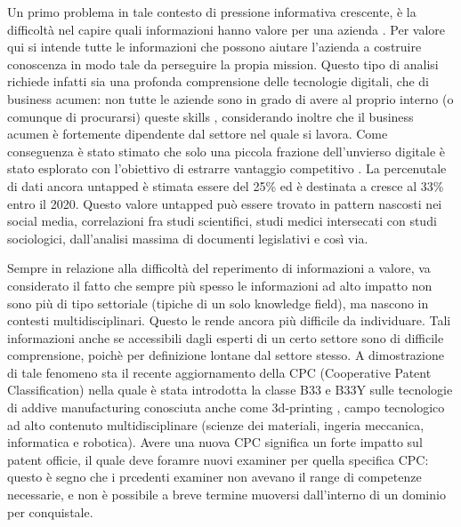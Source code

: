 \documentclass[]{book}
\begin{document}
Un primo problema in tale contesto di pressione informativa crescente, è
la difficoltà nel capire quali informazioni hanno valore per una azienda
\citep{larose2014discovering, chemchem2015data, kasemsap2015role} . Per
valore qui si intende tutte le informazioni che possono aiutare
l'azienda a costruire conoscenza in modo tale da perseguire la propia
mission. Questo tipo di analisi richiede infatti sia una profonda
comprensione delle tecnologie digitali, che di business acumen: non
tutte le aziende sono in grado di avere al proprio interno (o comunque
di procurarsi) queste skills
\citep{hecklau2016holistic, davenport2012data, provost2013data, van2014data},
considerando inoltre che il business acumen è fortemente dipendente dal
settore nel quale si lavora. Come conseguenza è stato stimato che solo
una piccola frazione dell'unvierso digitale è stato esplorato con
l'obiettivo di estrarre vantaggio competitivo \citep{data2012bigger}. La
percenutale di dati ancora untapped è stimata essere del 25\% ed è
destinata a cresce al 33\% entro il 2020. Questo valore untapped può
essere trovato in pattern nascosti nei social media, correlazioni fra
studi scientifici, studi medici intersecati con studi sociologici,
dall'analisi massima di documenti legislativi e così via.

Sempre in relazione alla difficoltà del reperimento di informazioni a
valore, va considerato il fatto che sempre più spesso le informazioni ad
alto impatto non sono più di tipo settoriale (tipiche di un solo
knowledge field), ma nascono in contesti multidisciplinari. Questo le
rende ancora più difficile da individuare. Tali informazioni anche se
accessibili dagli esperti di un certo settore sono di difficile
comprensione, poichè per definizione lontane dal settore stesso. A
dimostrazione di tale fenomeno sta il recente aggiornamento della CPC
(Cooperative Patent Classification) nella quale è stata introdotta la
classe B33 e B33Y sulle tecnologie di addive manufacturing conosciuta
anche come 3d-printing \citep{cpc2014}, campo tecnologico ad alto
contenuto multidisciplinare (scienze dei materiali, ingeria meccanica,
informatica e robotica). Avere una nuova CPC significa un forte impatto
sul patent officie, il quale deve foramre nuovi examiner per quella
specifica CPC: questo è segno che i prcedenti examiner non avevano il
range di competenze necessarie, e non è possibile a breve termine
muoversi dall'interno di un dominio per conquistale.
\end{document}
